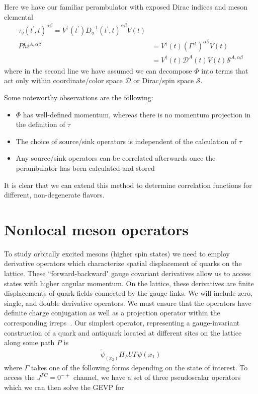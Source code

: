 Here we have our familiar perambulator with exposed Dirac indices and meson elemental
\begin{align}
    \tau_q(t^\prime, t)^{\alpha \beta} = V^\dagger(t^\prime) D^{-1}_q(t^\prime, t)^{\alpha \beta} V(t) \\
    Phi^{A, \alpha\beta} 
&= V^\dagger(t) (\Gamma^A)^{\alpha \beta} V(t) \\
&= V^\dagger(t) \mathcal D^A(t)V(t) \mathcal S^{A, \alpha \beta}
\end{align}
where in the second line we have assumed we can decompose $\Phi$ into  terms that act only within coordinate/color space $\mathcal D$ or Dirac/spin space $\mathcal S$.

Some noteworthy observations are the following: 
\begin{itemize}
    \item $\Phi$ has well-defined momentum, whereas there is no momentum projection in the definition of $\tau$ 
    \item The choice of source/sink operators is independent of the calculation of $\tau$
	\item Any source/sink operators can be correlated afterwards once the perambulator has been calculated and stored
\end{itemize}
It is clear that we can extend this method to determine correlation functions for different, non-degenerate flavors.


\section{Nonlocal meson operators}
To study orbitally excited mesons (higher spin states) we need to employ derivative operators which characterize spatial displacement of quarks on the lattice. These ``forward-backward" gauge covariant derivatives allow us to access states with higher angular momentum. On the lattice, these derivatives are finite displacements of quark fields connected by the gauge links. We will include zero, single, and double derivative operators. We must ensure that the operators have definite charge conjugation as well as a projection operator within the corresponding irreps~\cite{liao2002excitedcharmoniumspectrumanisotropic}. Our simplest operator, representing a gauge-invariant construction of a quark and antiquark located at different sites on the lattice along some path $P$ is 
\begin{align}
    \tilde{\psi}_(x_2)\Pi_P U \Gamma \psi(x_1)
\end{align}
where $\Gamma$ takes one of the following forms depending on the state of interest. To access the $J^{PC}=0^{-+}$ channel, we have a set of three pseudoscalar operators which we can then solve the GEVP for

